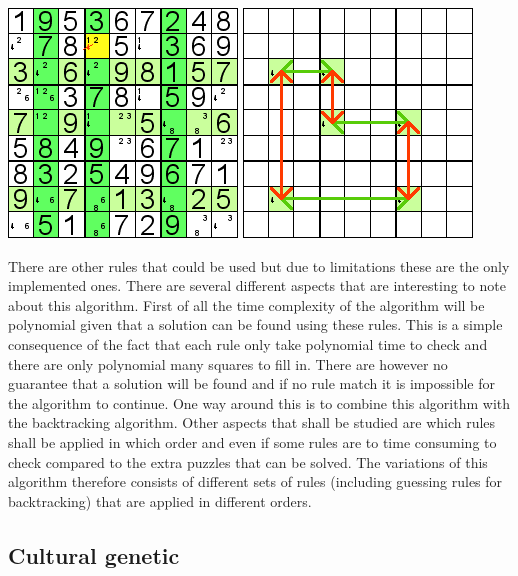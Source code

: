 \documentclass[a4paper,11pt]{kth-mag}
\begin{document}
\begin{description}
\includegraphics{images/swordfish1.png}
\newline
\includegraphics{images/swordfish2.png}

\end{description}

There are other rules that could be used but due to limitations these are the only implemented ones. There are several different aspects that are interesting to note about this algorithm. First of all the time complexity of the algorithm will be polynomial given that a solution can be found using these rules. This is a simple consequence of the fact that each rule only take polynomial time to check and there are only polynomial many squares to fill in. There are however no guarantee that a solution will be found and if no rule match it is impossible for the algorithm to continue. One way around this is to combine this algorithm with the backtracking algorithm. Other aspects that shall be studied are which rules shall be applied in which order and even if some rules are to time consuming to check compared to the extra puzzles that can be solved. The variations of this algorithm therefore consists of different sets of rules (including guessing rules for backtracking) that are applied in different orders. 

\subsection{Cultural genetic}
\end{document}
